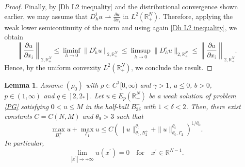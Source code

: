 \documentclass[12pt,reqno]{amsart}
\newtheorem{lemma}[theorem]{Lemma}
\begin{document}
\begin{proof}
Finally, by \eqref{Dh L2 inequality} and the distributional convergence shown earlier, we may assume that $D_h^iu\rightharpoonup \frac{\partial u}{\partial x_i}$ in $L^2(\mathds{R}^N_+)$. Therefore, applying the weak lower semicontinuity of the norm and using again \eqref{Dh L2 inequality}, we obtain
\begin{equation*}
   \left\| \frac{\partial u}{\partial x_i} \right\|_{2,\mathds{R}^N_+}\leq \liminf_{h\longrightarrow 0} \|D_h^i u\|_{2,\mathds{R}^N_+}\leq  \limsup_{h\longrightarrow 0} \|D_h^i u\|_{2,\mathds{R}^N_+}\leq \left\| \frac{\partial u}{\partial x_i} \right\|_{2,\mathds{R}^N_+}.
\end{equation*}
Hence, by the uniform convexity $L^2(\mathds{R}^N_+)$, we conclude the result.
\end{proof}

\begin{lemma}\label{Harnack inequality}
		Assume $(\rho_0)$ with $\rho \in C^1[0,\infty)$ and $\gamma>1$, $a\leq0$, $b>0$, $p\in(1,\infty)$ and $q\in [2,2_\ast]$. Let $u\in E_p(\mathds{R}^N_+) $ be a weak solution of problem \eqref{PG} satisfying $0< u \leq M$ in the half-ball $B_{3\delta}^{+}$ with $1<\delta<2$. Then, there exist constants $C=C(N,M)$ and $\theta_0>3$ such that
		\begin{equation}\label{H inequality}
		\max_{B_1^+}u+\max_{\Gamma_1}u\leq C\left(\| u \|_{\theta_0,B_{2}^+}^{\theta_0}+\| u \|_{{\theta_0},\Gamma_{2}}^{\theta_0} \right)^{1/\theta_0}.
		\end{equation}
		In particular, 
		\begin{equation}\label{decay}
		\lim_{|x^\prime|\longrightarrow +\infty}u(x^\prime)=0\quad \text{for}\quad x^\prime\in\mathds{R}^{N-1}.
		\end{equation}
	\end{lemma}
    
\end{document}
